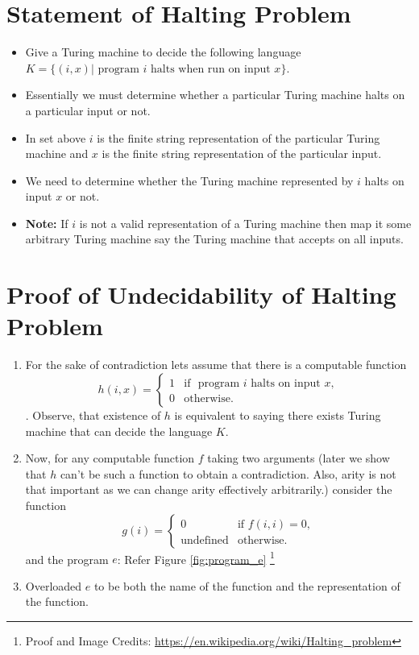 \documentclass[
11pt,notheorems,hyperref={pdfauthor=whatever}
]{beamer}
\begin{document}

\section{Statement of Halting Problem}
\begin{frame}
\begin{itemize}
    \setlength\itemsep{1em}
    \item Give a Turing machine to decide the following language $K = \{(i, x) | \text{ program } i \text{ halts when run on input } x\}$.
    \item Essentially we must determine whether a particular Turing machine halts on a particular input or not.
    \item In set above $i$ is the finite string representation of the particular Turing machine and $x$ is the finite string representation of the particular input.
    \item We need to determine whether the Turing machine represented by $i$ halts on input $x$ or not.
    \item \textbf{Note: } If $i$ is not a valid representation of a Turing machine then map it some arbitrary Turing machine say the Turing machine that accepts on all inputs.
\end{itemize}
\end{frame}

\section{Proof of Undecidability of Halting Problem}
\begin{frame}
\begin{enumerate}
    \item For the sake of contradiction lets assume that there is a computable function $$h(i, x) = \begin{cases}
  1 & \text{if } \text{  program }i\text{ halts on input }x, \\
  0 & \text{otherwise.}
\end{cases}$$. Observe, that existence of $h$ is equivalent to saying there exists Turing machine that can decide the language $K$.
    \item Now, for any computable function $f$ taking two arguments (later we show that $h$ can't be such a function to obtain a contradiction. Also, arity is not that important as we can change arity effectively arbitrarily.) consider the function $$g(i) = \begin{cases}
  0  & \text{if } f(i,i) = 0,\\
  \text{undefined} & \text{otherwise.}
\end{cases}$$ and the program $e$: Refer Figure \ref{fig:program_e} \footnote{Proof and Image Credits: \url{https://en.wikipedia.org/wiki/Halting\_problem}}
    \item Overloaded $e$ to be both the name of the function and the representation of the function.
\end{enumerate}
\end{frame}
\end{document}
